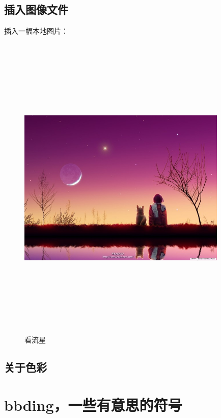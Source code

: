 \documentclass[a4paper,12pt]{article} %
\begin{document}
\subsection{插入图像文件}
插入一幅本地图片：\\
\begin{figure}[htbp] %
  \centering
  \includegraphics[width=10cm,height=15cm,keepaspectratio]{pic1.jpg}
  \caption{看流星}
  \label{fig:star1}
\end{figure}

\subsection{关于色彩} %

\section{bbding，一些有意思的符号}
\begin{Huge}
\HandRight \HandLeft \XSolid \Plus \Cross \CrossClowerTips \\
\CrossMaltese \FiveStar \FiveStarLines \SixStar \EightStar \TwelweStar \\
\SixteenStarLight \FiveFlowerOpen \FiveFlowerPetal \Snowflake \SnowflakeChevron \Sparkle \\
\SquareSolid \Square \TriangleUp \TriangleDown \OrnamentDiamondSolid \Ellipse \\
\Phone \Tape \Plane \Envelope \Peace \Checkmark \\
\end{Huge}
\end{document}
